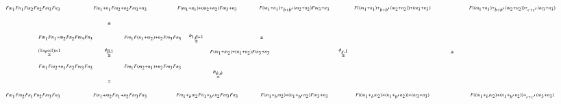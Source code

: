 \documentclass[reqno]{amsart}
\begin{document}
\[\begin{tikzpicture}[scale=1.6]
\node (1) at (1.875,2) {$\scriptscriptstyle{\stackrel{(1 \times \mu \times 1) \times 1} \cong}$};
\node (2) at (3.25,2) {$\scriptscriptstyle{\stackrel{\phi_{\beta,1}} \cong}$};
\node (3) at (3.25,2.66) {$\scriptscriptstyle{\cong}$};
\node (4) at (3.25,1.33) {$\scriptscriptstyle{\cong}$};
\node (5) at (5.75,1.5) {$\scriptscriptstyle{\stackrel{\phi_{\psi,\psi}} \cong}$};
\node (6) at (5.25,2.33) {$\scriptscriptstyle{\stackrel{\phi_{1,\beta+1}} \cong}$};
\node (7) at (6.75,2.33) {$\scriptscriptstyle{\cong}$};
\node (8) at (8.625,2) {$\scriptscriptstyle{\stackrel{\phi_{\chi,1}} \cong}$};
\node (9) at (11.125,2) {$\scriptscriptstyle{\cong}$};
\node (A) at (1.5,3) {$\scriptscriptstyle{Fm_1 Fn_1 Fm_2 Fn_2 Fm_3 Fn_3}$};
\node (A') at (3.5,3) {$\scriptscriptstyle{Fm_1+n_1 Fm_2+n_2 Fm_3+n_3}$};
\node (A'') at (5.5,3) {$\scriptscriptstyle{F(m_1+n_1)+(m_2+n_2) Fm_3+n_3}$};
\node (A''') at (7.5,3) {$\scriptscriptstyle{F(m_1+n_1)+_{b+b'}(m_2+n_2) Fm_3+n_3}$};
\node (A'''') at (9.75,3) {$\scriptscriptstyle{F((m_1+n_1)+_{b+b'}(m_2+n_2))+(m_3+n_3)}$};
\node (A''''') at (12.5,3) {$\scriptscriptstyle{F((m_1+n_1)+_{b+b'}(m_2+n_2))+_{c+c'}(m_3+n_3)}$};
\node (X) at (2.25,2.33) {$\scriptscriptstyle{Fm_1 Fn_1+m_2 Fn_2 Fm_3 Fn_3}$};
\node (X') at (4.25,2.33) {$\scriptscriptstyle{Fm_1 F(n_1+m_2)+n_2 Fm_3 Fn_3}$};
\node (X'') at (2.25,1.66) {$\scriptscriptstyle{Fm_1 Fm_2+n_1 Fn_2 Fm_3 Fn_3}$};
\node (X''') at (4.25,1.66) {$\scriptscriptstyle{Fm_1 F(m_2+n_1)+n_2 Fm_3 Fn_3}$};
\node (J) at (6.25,2) {$\scriptscriptstyle{F(m_1+m_2)+(n_1+n_2) Fm_3+n_3}$};
\node (B) at (1.5,1) {$\scriptscriptstyle{Fm_1 Fm_2 Fn_1 Fn_2 Fm_3 Fn_3}$};
\node (B') at (3.5,1) {$\scriptscriptstyle{Fm_1+m_2 Fn_1+n_2 Fm_3 Fn_3}$};
\node (B'') at (5.5,1) {$\scriptscriptstyle{Fm_1 +_b m_2 Fn_1 +_{b'} n_2 Fm_3 Fn_3}$};
\node (B''') at (7.5,1) {$\scriptscriptstyle{F(m_1+_b m_2)+(n_1+_{b'}n_2) Fm_3+n_3}$};
\node (B'''') at (9.75,1) {$\scriptscriptstyle{F((m_1+_b m_2)+(n_1+_{b'} n_2))+(m_3+n_3)}$};
\node (B''''') at (12.5,1) {$\scriptscriptstyle{F((m_1+_b m_2)+(n_1+_{b'}n_2))+_{c+c'}(m_3+n_3)}$};


\end{tikzpicture}\]
\end{document}
